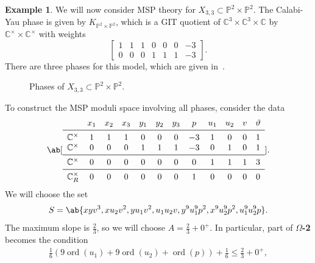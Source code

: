 \documentclass[10pt]{amsart}
\theoremstyle{definition}
\newtheorem{exm}[thm]{Example}
\theoremstyle{remark}
\theoremstyle{plain}
\theoremstyle{definition}
\theoremstyle{remark}
\newcommand{\C}{\mathbb{C}}
\renewcommand{\P}{\mathbb{P}}
\newcommand{\mc}[1]{\mathcal{#1}}
\newcommand{\on}[1]{\operatorname{#1}}
\newcommand{\1}{\mathbf{1}}
\newcommand{\2}{\mathbf{2}}
\newcommand{\3}{\mathbf{3}}
\begin{document}
\begin{exm}
    We will now consider MSP theory for $X_{3,3} \subset \P^2 \times \P^2$. The Calabi-Yau phase is given by $K_{\P^2 \times \P^2}$, which is a GIT quotient of $\C^3 \times \C^3 \times \C$ by $\C^{\times}\times \C^{\times}$ with weights
    \[ \begin{bmatrix}
        1 & 1 & 1 & 0 & 0 & 0 & -3 \\
        0 & 0 & 0 & 1 & 1 & 1 & -3
    \end{bmatrix}. \]
    There are three phases for this model, which are given in~.
    \begin{figure}[htpb]
    \begin{center}
    \end{center}
    \caption{Phases of $X_{3,3} \subset \P^2 \times \P^2$.}%
    \label{fig:p2p2}
    \end{figure}
    To construct the MSP moduli space involving all phases, consider the data 
    \[ \ab[\begin{array}{cccccccccccc}
        & x_1 & x_2 & x_3 & y_1 & y_2 & y_3 & p & u_1 & u_2 & v & \vartheta \\
        \midrule
        \C^{\times} & 1 & 1 & 1 & 0 & 0 & 0 & -3 & 1 & 0 & 0 & 1 \\
        \C^{\times} & 0 & 0 & 0 & 1 & 1 & 1 & -3 & 0 & 1 & 0 & 1 \\
        \midrule
        \C^{\times} & 0 & 0 & 0 & 0 & 0 & 0 & 0 & 1 & 1 & 1 & 3 \\
        \midrule
        \C^{\times}_R & 0 & 0 & 0 & 0 & 0 & 0 & 1 & 0 & 0 & 0 & 0
    \end{array}]. \]
    We will choose the set
    \[ S = \ab\{ xyv^3, xu_2 v^2, yu_1 v^2, u_1u_2 v, y^9 u_1^9 p^2, x^9 u_2^9 p^2, u_1^9 u_2^9 p\}. \]
    The maximum slope is $\frac{2}{3}$, so we will choose $A = \frac{2}{3} + 0^+$. In particular, part of \textbf{$\Omega$-2} becomes the condition
    \begin{align*}
        \frac{1}{6} (9 \on{ord}(u_1) + 9 \on{ord}(u_2) + \on{ord}(p)) + \frac{1}{6} \leq \frac{2}{3} + 0^+,

\end{align*}
\end{exm}
\end{document}
